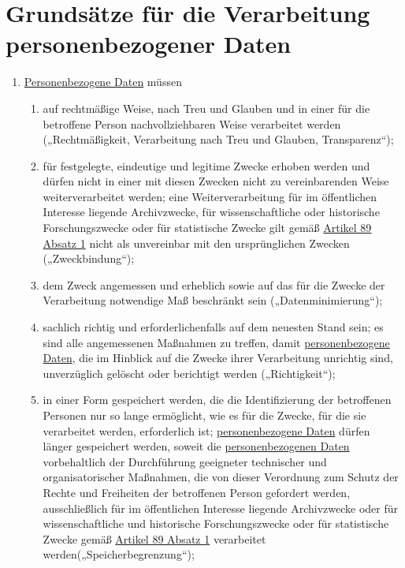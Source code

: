 \chapter{Grundsätze für die Verarbeitung personenbezogener Daten}
\label{ch:5}


\begin{enumerate}

  \item \hyperref[itm:04-1]{Personenbezogene Daten} müssen
  \label{itm:05-1}

  \begin{enumerate}
  
    \item auf rechtmäßige Weise, nach Treu und Glauben und in einer für die betroffene Person nachvollziehbaren Weise
     verarbeitet werden („Rechtmäßigkeit, Verarbeitung nach Treu und Glauben, Transparenz“);
    \label{itm:05-1a}

    \item für festgelegte, eindeutige und legitime Zwecke erhoben werden und dürfen nicht in einer mit diesen Zwecken
     nicht zu vereinbarenden Weise weiterverarbeitet werden; eine Weiterverarbeitung für im öffentlichen Interesse
     liegende Archivzwecke, für wissenschaftliche oder historische Forschungszwecke oder für statistische Zwecke gilt
     gemäß \hyperref[itm:89-1]{Artikel 89 Absatz 1} nicht als unvereinbar mit den ursprünglichen
     Zwecken („Zweckbindung“);
    \label{itm:05-1b}

    \item dem Zweck angemessen und erheblich sowie auf das für die Zwecke der Verarbeitung notwendige Maß beschränkt
     sein („Datenminimierung“);
    \label{itm:05-1c}

    \item sachlich richtig und erforderlichenfalls auf dem neuesten Stand sein; es sind alle angemessenen Maßnahmen zu
     treffen, damit \hyperref[itm:04-1]{personenbezogene Daten}, die im Hinblick auf die Zwecke ihrer Verarbeitung unrichtig sind,
     unverzüglich gelöscht oder berichtigt werden („Richtigkeit“);
    \label{itm:05-1d}

    \item in einer Form gespeichert werden, die die Identifizierung der betroffenen Personen nur so lange ermöglicht,
     wie es für die Zwecke, für die sie verarbeitet werden, erforderlich ist; \hyperref[itm:04-1]{personenbezogene Daten} dürfen länger
     gespeichert werden, soweit die \hyperref[itm:04-1]{personenbezogenen Daten} vorbehaltlich der Durchführung geeigneter technischer und
     organisatorischer Maßnahmen, die von dieser Verordnung zum Schutz der Rechte und Freiheiten der betroffenen Person
     gefordert werden, ausschließlich für im öffentlichen Interesse liegende Archivzwecke oder für wissenschaftliche
     und historische Forschungszwecke oder für statistische Zwecke gemäß \hyperref[itm:89-1]{Artikel 89 Absatz 1}
     verarbeitet werden(„Speicherbegrenzung“);
    \label{itm:05-1e}


\end{enumerate}
\end{enumerate}
